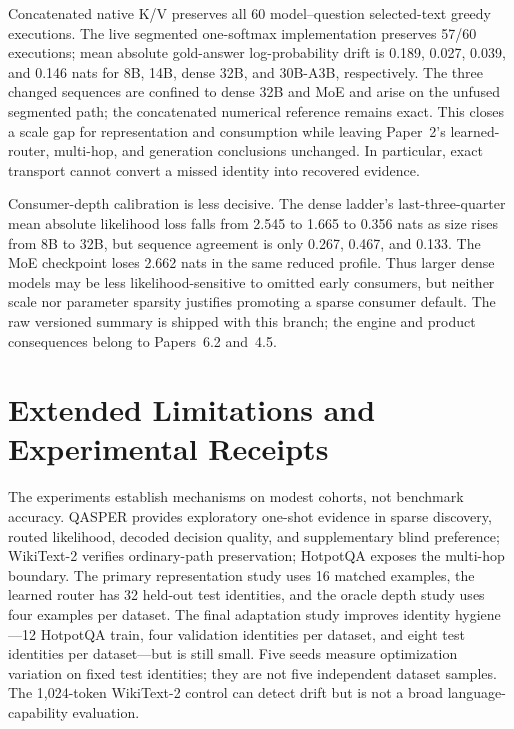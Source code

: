 \documentclass[11pt]{article}
\begin{document}
Concatenated native K/V preserves all 60 model--question selected-text greedy executions. The
live segmented one-softmax implementation preserves 57/60 executions; mean absolute
gold-answer log-probability drift is 0.189, 0.027, 0.039, and 0.146 nats for
8B, 14B, dense 32B, and 30B-A3B, respectively. The three changed sequences are
confined to dense 32B and MoE and arise on the unfused segmented path; the
concatenated numerical reference remains exact. This closes a scale gap for
representation and consumption while leaving Paper~2's learned-router,
multi-hop, and generation conclusions unchanged. In particular, exact
transport cannot convert a missed identity into recovered evidence.

Consumer-depth calibration is less decisive. The dense ladder's
last-three-quarter mean absolute likelihood loss falls from 2.545 to 1.665 to
0.356 nats as size rises from 8B to 32B, but sequence agreement is only 0.267,
0.467, and 0.133. The MoE checkpoint loses 2.662 nats in the same reduced
profile. Thus larger dense models may be less likelihood-sensitive to omitted
early consumers, but neither scale nor parameter sparsity justifies promoting
a sparse consumer default. The raw versioned summary is shipped with this
branch; the engine and product consequences belong to Papers~6.2 and~4.5.

\section{Extended Limitations and Experimental Receipts}
\label{app:extended-limitations}

The experiments establish mechanisms on modest cohorts, not benchmark accuracy. QASPER provides
exploratory one-shot evidence in sparse discovery, routed likelihood, decoded decision quality,
and supplementary blind preference;
WikiText-2 verifies ordinary-path preservation; HotpotQA exposes the multi-hop boundary. The primary
representation study uses 16 matched examples, the learned router has 32 held-out test identities,
and the oracle depth study uses four examples per dataset. The final adaptation study improves
identity hygiene---12 HotpotQA train, four validation identities per dataset, and eight test
identities per dataset---but is still small. Five seeds measure optimization variation on fixed
test identities; they are not five independent dataset samples. The 1,024-token WikiText-2
control can detect drift but is not a broad language-capability evaluation.
\end{document}
